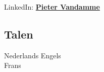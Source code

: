 \documentclass[a4paper]{deedy-resume} %
\begin{document}
\begin{minipage}[t]{0.33\textwidth}
LinkedIn: \href{https://be.linkedin.com/in/pieter-vandamme-700b03a0}{\bf Pieter Vandamme} 

\sectionspace %

\subsection{Talen}

Nederlands \textbullet{} Engels  \\

\vspace{\topsep} %
Frans

\sectionspace %


\end{minipage} %
\hfill
%
%
\end{document}
